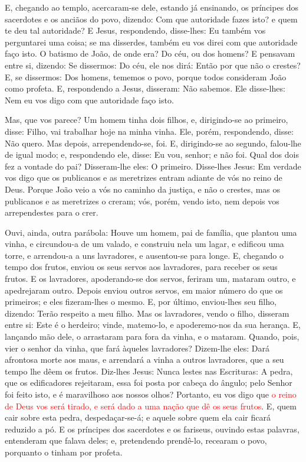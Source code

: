E, chegando ao templo, acercaram-se dele, estando já ensinando,
os príncipes dos sacerdotes e os anciãos do povo, dizendo: Com que
autoridade fazes isto? e quem te deu tal autoridade? E Jesus,
respondendo, disse-lhes: Eu também vos perguntarei uma coisa; se ma
disserdes, também eu vos direi com que autoridade faço isto.
O batismo de João, de onde era? Do céu, ou dos homens? E
pensavam entre si, dizendo: Se dissermos: Do céu, ele nos dirá:
Então por que não o crestes? E, se dissermos: Dos homens,
tememos o povo, porque todos consideram João como profeta. E,
respondendo a Jesus, disseram: Não sabemos. Ele disse-lhes: Nem eu
vos digo com que autoridade faço isto.

Mas, que vos parece? Um homem tinha dois filhos, e, dirigindo-se
ao primeiro, disse: Filho, vai trabalhar hoje na minha vinha.
Ele, porém, respondendo, disse: Não quero. Mas depois,
arrependendo-se, foi. E, dirigindo-se ao segundo, falou-lhe
de igual modo; e, respondendo ele, disse: Eu vou, senhor; e não foi.
Qual dos dois fez a vontade do pai? Disseram-lhe eles: O
primeiro. Disse-lhes Jesus: Em verdade vos digo que os publicanos e
as meretrizes entram adiante de vós no reino de Deus. Porque
João veio a vós no caminho da justiça, e não o crestes, mas os
publicanos e as meretrizes o creram; vós, porém, vendo isto, nem
depois vos arrependestes para o crer.

Ouvi, ainda, outra parábola: Houve um homem, pai de família, que
plantou uma vinha, e circundou-a de um valado, e construiu nela um
lagar, e edificou uma torre, e arrendou-a a uns lavradores, e
ausentou-se para longe. E, chegando o tempo dos frutos,
enviou os seus servos aos lavradores, para receber os seus frutos.
E os lavradores, apoderando-se dos servos, feriram um,
mataram outro, e apedrejaram outro. Depois enviou outros
servos, em maior número do que os primeiros; e eles fizeram-lhes o
mesmo. E, por último, enviou-lhes seu filho, dizendo: Terão
respeito a meu filho. Mas os lavradores, vendo o filho,
disseram entre si: Este é o herdeiro; vinde, matemo-lo, e
apoderemo-nos da sua herança. E, lançando mão dele, o
arrastaram para fora da vinha, e o mataram. Quando, pois,
vier o senhor da vinha, que fará àqueles lavradores?
Dizem-lhe eles: Dará afrontosa morte aos maus, e arrendará a
vinha a outros lavradores, que a seu tempo lhe dêem os frutos.
Diz-lhes Jesus: Nunca lestes nas Escrituras: A pedra, que os
edificadores rejeitaram, essa foi posta por cabeça do ângulo; pelo
Senhor foi feito isto, e é maravilhoso aos nossos olhos?
Portanto, eu vos digo que \textcolor{red}{o reino de Deus vos será
tirado, e será dado a uma nação que dê os seus frutos}. E,
quem cair sobre esta pedra, despedaçar-se-á; e aquele sobre quem ela
cair ficará reduzido a pó. E os príncipes dos sacerdotes e os
fariseus, ouvindo estas palavras, entenderam que falava deles;
e, pretendendo prendê-lo, recearam o povo, porquanto o tinham
por profeta.

